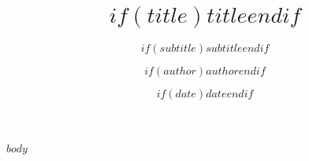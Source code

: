 \documentclass[..]{_config/fineprintbrief}
\title{$if(title)$$title$$endif$}
\subtitle{$if(subtitle)$$subtitle$$endif$}
\author{$if(author)$$author$$endif$}
\date{$if(date)$$date$$endif$}
\begin{document}
\maketitle

$body$
\end{document}
